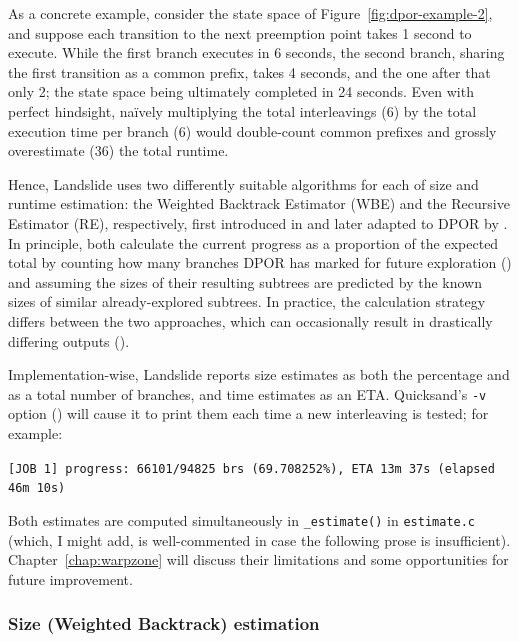 As a concrete example, consider the state space of Figure~\ref{fig:dpor-example-2},
and suppose each transition to the next preemption point takes 1 second to execute.
While the first branch executes in 6 seconds,
the second branch, sharing the first transition as a common prefix, takes 4 seconds,
and the one after that only 2;
the state space being ultimately completed in 24 seconds.
Even with perfect hindsight,
na\"ively multiplying the total interleavings (6)
by the total execution time per branch (6) would double-count common prefixes
and grossly overestimate (36) the total runtime.

Hence, Landslide uses two differently suitable algorithms for each of size and runtime estimation:
the Weighted Backtrack Estimator (WBE) and the Recursive Estimator (RE), respectively,
first introduced in \cite{estimating-search-tree-size} and later adapted to DPOR by \cite{estimation}.
In principle, both calculate the current progress as a proportion of the expected total
by counting how many branches DPOR has marked for future exploration (\sect{\ref{sec:landslide-explore}})
and assuming the sizes of their resulting subtrees are predicted by the known sizes of similar already-explored subtrees.
In practice, the calculation strategy differs between the two approaches,
which can occasionally result in drastically differing outputs (\sect{\ref{sec:tm-verif}}).

Implementation-wise, Landslide reports size estimates as both the percentage and as a total number of branches,
and time estimates as an ETA.
Quicksand's {\tt -v} option (\sect{\ref{sec:landslide-quicksand-options}})
will cause it to print them each time a new interleaving is tested; for example:
\begin{center}
	{\tt \small [JOB 1] progress: 66101/94825 brs (69.708252\%), ETA 13m 37s (elapsed 46m 10s)}
\end{center}
Both estimates are computed simultaneously in {\tt \_estimate()} in {\tt estimate.c}
(which, I might add, is well-commented in case the following prose is insufficient).
Chapter~\ref{chap:warpzone} will discuss their limitations and some opportunities for future improvement.

\subsubsection{Size (Weighted Backtrack) estimation}

